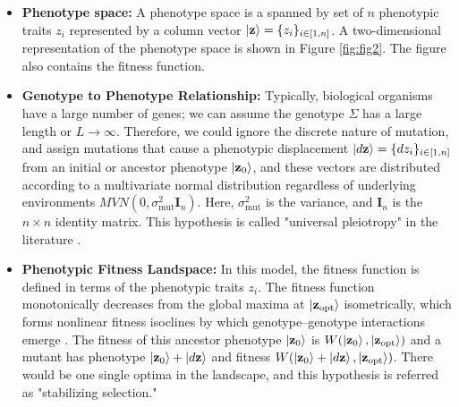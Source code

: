 \documentclass[11pt]{article}
\begin{document}
\begin{itemize}
    \item \textbf{Phenotype space:} A phenotype space is a spanned by set of \( n \) phenotypic traits \( z_i \) represented by a column vector \( \ket{\mathbf{z}} = \{z_i\}_{i \in [1,n]} \). A two-dimensional representation of the phenotype space is shown in Figure \ref{fig:fig2}. The figure also contains the fitness function.
    \item \textbf{Genotype to Phenotype Relationship:} Typically, biological organisms have a large number of genes; we can assume the genotype $\Sigma$ has a large length or $L\to \infty$. Therefore, we could ignore the discrete nature of mutation, and assign mutations that cause a phenotypic displacement \( \ket{d\mathbf{z}} = \{dz_i\}_{i \in [1,n]} \) from an initial or ancestor phenotype \( \ket{\mathbf{z}_0} \), and these vectors are distributed according to a multivariate normal distribution regardless of underlying environments $MVN(0, \sigma^2_{\mathrm{mut}} \mathbf{I}_n )$. Here, $\sigma_{\mathrm{mut}}^2$ is the variance, and $\mathbf{I}_n$ is the $n \times n$ identity matrix. This hypothesis is called "universal pleiotropy" in the literature \cite{paaby2013many}.
    \item \textbf{Phenotypic Fitness Landspace:} In this model, the fitness function is defined in terms of the phenotypic traits $z_i$. The fitness function monotonically decreases from the global maxima at $\ket{\mathbf{z}_{\mathrm{opt}}}$ isometrically, which forms nonlinear fitness isoclines by which genotype–genotype interactions emerge \cite{blanquart2014properties}. The fitness of this ancestor phenotype \( \ket{\mathbf{z}_0} \) is $W(\ket{\mathbf{z}_0}, \ket{\mathbf{z}_{\mathrm{opt}}})$ and a mutant has phenotype \( \ket{\mathbf{z}_0} + \ket{d\mathbf{z}} \) and fitness \( W( \ket{\mathbf{z}_0} + \ket{ d\mathbf{z}}, \ket{\mathbf{z}_{\mathrm{opt}}}) \). There would be one single optima in the landscape, and this hypothesis is referred as "stabilizing selection."
     

\end{itemize}
\end{document}
